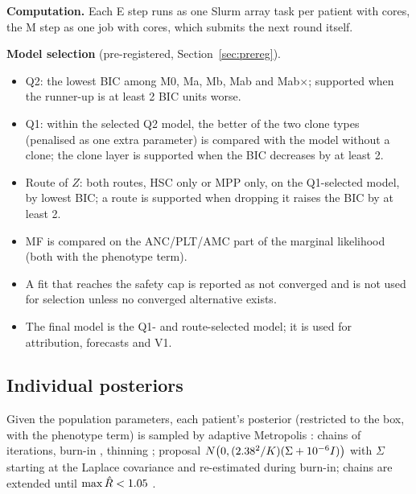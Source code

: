 \documentclass[11pt]{article}
\begin{document}
\textbf{Computation.} Each E step runs as one Slurm array task per patient with \valEcores{} cores, the M step as one job with \valMcores{} cores, which submits the next round itself.



\textbf{Model selection} (pre-registered, Section~\ref{sec:prereg}).
\begin{itemize}
\item Q2: the lowest BIC among M0, Ma, Mb, Mab and Mab$\times$; supported when the runner-up is at least 2 BIC units worse.
\item Q1: within the selected Q2 model, the better of the two clone types (penalised as one extra parameter) is compared with the model without a clone; the clone layer is supported when the BIC decreases by at least 2.
\item Route of $Z$: both routes, HSC only or MPP only, on the Q1-selected model, by lowest BIC; a route is supported when dropping it raises the BIC by at least 2.
\item MF is compared on the ANC/PLT/AMC part of the marginal likelihood (both with the phenotype term).
\item A fit that reaches the safety cap is reported as not converged and is not used for selection unless no converged alternative exists.
\item The final model is the Q1- and route-selected model; it is used for attribution, forecasts and V1.
\end{itemize}

\subsection{Individual posteriors}
Given the population parameters, each patient's posterior (restricted to the box, with the phenotype term) is sampled by adaptive Metropolis \citep{haario2001}: \valChains{} chains of \valIter{} iterations, burn-in \valBurn, thinning \valThin; proposal $N\bigl(0,(2.38^2/K)(\Sigma+10^{-6}I)\bigr)$ with $\Sigma$ starting at the Laplace covariance and re-estimated during burn-in; chains are extended until $\max\hat R<1.05$ \citep{gelman1992}.

\end{document}
